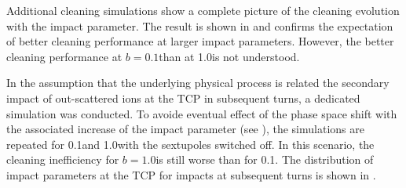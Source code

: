 Additional cleaning simulations show a complete picture of the cleaning evolution with the impact parameter. The result is shown in  and confirms the expectation of better cleaning performance at larger impact parameters. However, the better cleaning performance at $b=0.1$\mum than at 1.0\mum is not understood. 

In the assumption that the underlying physical process is related the secondary impact of out-scattered \lead ions at the TCP in subsequent turns, a dedicated simulation was conducted. To avoide eventual effect of the phase space shift with the associated increase of the impact parameter (see ), the simulations are repeated for 0.1\mum and 1.0\mum with the sextupoles switched off. In this scenario, the cleaning inefficiency for $b=1.0$\mum is still worse than for 0.1\mum. The distribution of impact parameters at the TCP for impacts at subsequent turns is shown in . 























